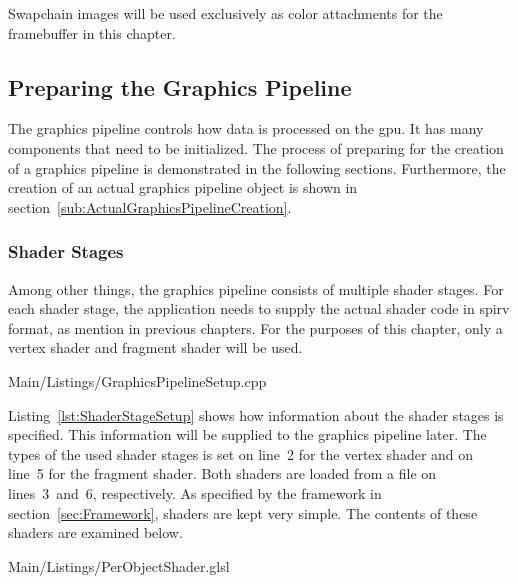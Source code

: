       Swapchain images will be used exclusively as color attachments for the framebuffer in this chapter.

    \subsection{Preparing the Graphics Pipeline}
    \label{subsec:GraphicsPipelineSetup}
      The graphics pipeline controls how data is processed on the \gls{gpu}.
      It has many components that need to be initialized.
      The process of preparing for the creation of a graphics pipeline is demonstrated in the following sections.
      Furthermore, the creation of an actual graphics pipeline object is shown in section~\ref{sub:ActualGraphicsPipelineCreation}.

      \subsubsection{Shader Stages}
      \label{sss:GraphicsPipelineShaderStages}
        Among other things, the graphics pipeline consists of multiple shader stages.
        For each shader stage, the application needs to supply the actual shader code in \gls{spirv} format, as mention in previous chapters.
        For the purposes of this chapter, only a vertex shader and fragment shader will be used.

        
        {Main/Listings/GraphicsPipelineSetup.cpp}

        Listing~\ref{lst:ShaderStageSetup} shows how information about the shader stages is specified.
        This information will be supplied to the graphics pipeline later.
        The types of the used shader stages is set on line~2 for the vertex shader and on line~5 for the fragment shader.
        Both shaders are loaded from a file on lines~3~and~6, respectively.
        As specified by the framework in section~\ref{sec:Framework}, shaders are kept very simple.
        The contents of these shaders are examined below.

        
        {Main/Listings/PerObjectShader.glsl}

